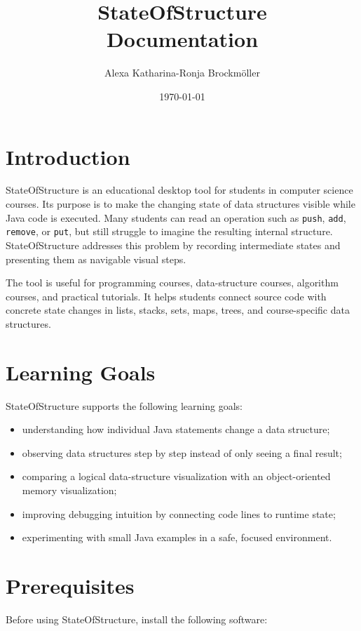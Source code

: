\documentclass[12pt,a4paper]{article}
\title{StateOfStructure\\\large Documentation}
\author{Alexa Katharina-Ronja Brockmöller}
\date{\today}
\begin{document}
\maketitle
\tableofcontents
\newpage

\section{Introduction}
StateOfStructure is an educational desktop tool for students in computer science courses. Its purpose is to make the 
changing state of data structures visible while Java code is executed. Many students can read an operation such as 
\texttt{push}, \texttt{add}, \texttt{remove}, or \texttt{put}, but still struggle to imagine the resulting internal structure. 
StateOfStructure addresses this problem by recording intermediate states and presenting them as navigable visual steps.

The tool is useful for programming courses, data-structure courses, algorithm courses, and practical tutorials. 
It helps students connect source code with concrete state changes in lists, stacks, sets, maps, trees, and 
course-specific data structures.

\section{Learning Goals}

StateOfStructure supports the following learning goals:

\begin{itemize}[noitemsep]
    \item understanding how individual Java statements change a data structure;
    \item observing data structures step by step instead of only seeing a final result;
    \item comparing a logical data-structure visualization with an object-oriented memory visualization;
    \item improving debugging intuition by connecting code lines to runtime state;
    \item experimenting with small Java examples in a safe, focused environment.
\end{itemize}

\section{Prerequisites}

Before using StateOfStructure, install the following software:
\end{document}
